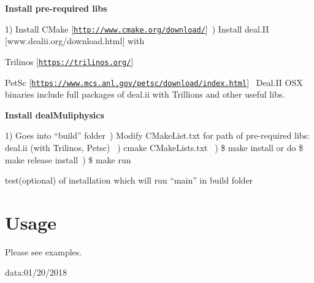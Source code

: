 \begin{DoxyEnumerate}
\item {\bfseries Install pre-\/required libs}~\newline


1) Install C\+Make \mbox{[}\href{http://www.cmake.org/download/}{\tt http\+://www.\+cmake.\+org/download/}\mbox{]}~) Install deal.\+II \mbox{[}www.\+dealii.\+org/download.html\mbox{]} with~\newline

\begin{DoxyItemize}
\item Trilinos \mbox{[}\href{https://trilinos.org/}{\tt https\+://trilinos.\+org/}\mbox{]}~\newline

\item Pet\+Sc \mbox{[}\href{https://www.mcs.anl.gov/petsc/download/index.html}{\tt https\+://www.\+mcs.\+anl.\+gov/petsc/download/index.\+html}\mbox{]}~\newline
 Deal.\+II O\+SX binaries include full packages of deal.\+ii with Trillions and other useful libs.
\end{DoxyItemize}
\item {\bfseries Install deal\+Muliphysics}~\newline


1) Goes into “build” folder~) Modify C\+Make\+List.\+txt for path of pre-\/required libs\+: deal.\+ii (with Trilinos, Petsc) ~) cmake C\+Make\+Lists.\+txt ~) \$ make install or do \$ make release install~) \$ make run ~\newline

\begin{DoxyItemize}
\item test(optional) of installation which will run “main” in build folder ~\newline

\end{DoxyItemize}
\end{DoxyEnumerate}

\section*{{\bfseries Usage}~\newline
 }

Please see examples.

data\+:01/20/2018 